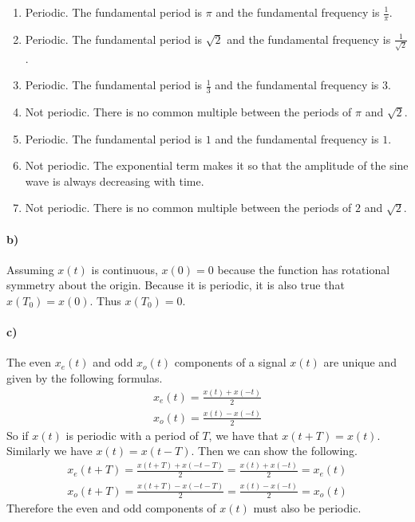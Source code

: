 \documentclass[12pt]{article}
\begin{document}
\begin{enumerate}
    \item Periodic. The fundamental period is \(\pi\) and the fundamental frequency is \(\frac{1}{\pi}\).
    \item Periodic. The fundamental period is \(\sqrt{2}\) and the fundamental frequency is \(\frac{1}{\sqrt{2}}\).
    \item Periodic. The fundamental period is \(\frac{1}{3}\) and the fundamental frequency is \(3\).
    \item Not periodic. There is no common multiple between the periods of \(\pi\) and \(\sqrt{2}\).
    \item Periodic. The fundamental period is \(1\) and the fundamental frequency is \(1\).
    \item Not periodic. The exponential term makes it so that the amplitude of the sine wave is always decreasing with time.
    \item Not periodic. There is no common multiple between the periods of \(2\) and \(\sqrt{2}\).
\end{enumerate}

\paragraph{b)}

Assuming \(x(t)\) is continuous, \(x(0)=0\) because the function has rotational symmetry about the origin. Because it is periodic, it is also true that \(x(T_0)=x(0)\).
Thus \(x(T_0)=0\).

\paragraph{c)}

The even \(x_e(t)\) and odd \(x_o(t)\) components of a signal \(x(t)\) are unique and given by the following formulas.
\begin{gather*}
    x_e(t) = \frac{x(t)+x(-t)}{2}\\
    x_o(t) = \frac{x(t)-x(-t)}{2}
\end{gather*}
So if \(x(t)\) is periodic with a period of \(T\), we have that \(x(t+T)=x(t)\). Similarly we have \(x(t)=x(t-T)\). Then we can show the following.
\begin{gather*}
    x_e(t+T) = \frac{x(t+T)+x(-t-T)}{2} = \frac{x(t)+x(-t)}{2} = x_e(t)\\
    x_o(t+T) = \frac{x(t+T)-x(-t-T)}{2} = \frac{x(t)-x(-t)}{2} = x_o(t)
\end{gather*}
Therefore the even and odd components of \(x(t)\) must also be periodic.
\end{document}
